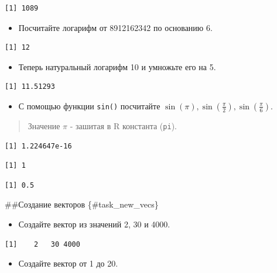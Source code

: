 \documentclass[
]{book}
\providecommand{\tightlist}{%
  \setlength{\itemsep}{0pt}\setlength{\parskip}{0pt}}
\begin{document}
\begin{verbatim}
[1] 1089
\end{verbatim}

\begin{itemize}
\tightlist
\item
  Посчитайте логарифм от 8912162342 по основанию 6.
\end{itemize}

\begin{verbatim}
[1] 12
\end{verbatim}

\begin{itemize}
\tightlist
\item
  Теперь натуральный логарифм 10 и умножьте его на 5.
\end{itemize}

\begin{verbatim}
[1] 11.51293
\end{verbatim}

\begin{itemize}
\tightlist
\item
  С помощью функции \texttt{sin()} посчитайте \(\sin (\pi), \sin \left(\frac{\pi}{2}\right), \sin \left(\frac{\pi}{6}\right)\).
\end{itemize}

\begin{quote}
Значение \(\pi\) - зашитая в R константа (\texttt{pi}).
\end{quote}

\begin{verbatim}
[1] 1.224647e-16
\end{verbatim}

\begin{verbatim}
[1] 1
\end{verbatim}

\begin{verbatim}
[1] 0.5
\end{verbatim}

\#\#Создание векторов \{\#task\_new\_vecs\}

\begin{itemize}
\tightlist
\item
  Создайте вектор из значений 2, 30 и 4000.
\end{itemize}

\begin{verbatim}
[1]    2   30 4000
\end{verbatim}

\begin{itemize}
\tightlist
\item
  Создайте вектор от 1 до 20.
\end{itemize}
\end{document}
